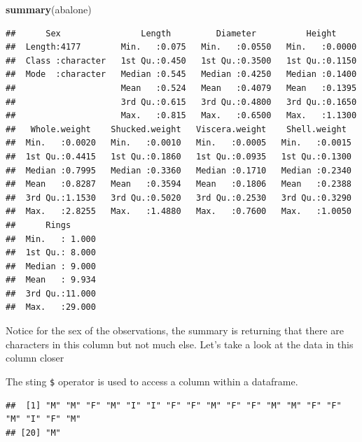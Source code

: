 \documentclass[
]{book}
\newenvironment{Shaded}{\begin{snugshade}}{\end{snugshade}}
\newcommand{\AttributeTok}[1]{\textcolor[rgb]{0.13,0.29,0.53}{#1}}
\newcommand{\CommentTok}[1]{\textcolor[rgb]{0.56,0.35,0.01}{\textit{#1}}}
\newcommand{\DecValTok}[1]{\textcolor[rgb]{0.00,0.00,0.81}{#1}}
\newcommand{\FunctionTok}[1]{\textcolor[rgb]{0.13,0.29,0.53}{\textbf{#1}}}
\newcommand{\NormalTok}[1]{#1}
\newcommand{\SpecialCharTok}[1]{\textcolor[rgb]{0.81,0.36,0.00}{\textbf{#1}}}
\begin{document}
\begin{Shaded}
\begin{Highlighting}[]
\FunctionTok{summary}\NormalTok{(abalone)}
\end{Highlighting}
\end{Shaded}

\begin{verbatim}
##      Sex                Length         Diameter          Height      
##  Length:4177        Min.   :0.075   Min.   :0.0550   Min.   :0.0000  
##  Class :character   1st Qu.:0.450   1st Qu.:0.3500   1st Qu.:0.1150  
##  Mode  :character   Median :0.545   Median :0.4250   Median :0.1400  
##                     Mean   :0.524   Mean   :0.4079   Mean   :0.1395  
##                     3rd Qu.:0.615   3rd Qu.:0.4800   3rd Qu.:0.1650  
##                     Max.   :0.815   Max.   :0.6500   Max.   :1.1300  
##   Whole.weight    Shucked.weight   Viscera.weight    Shell.weight   
##  Min.   :0.0020   Min.   :0.0010   Min.   :0.0005   Min.   :0.0015  
##  1st Qu.:0.4415   1st Qu.:0.1860   1st Qu.:0.0935   1st Qu.:0.1300  
##  Median :0.7995   Median :0.3360   Median :0.1710   Median :0.2340  
##  Mean   :0.8287   Mean   :0.3594   Mean   :0.1806   Mean   :0.2388  
##  3rd Qu.:1.1530   3rd Qu.:0.5020   3rd Qu.:0.2530   3rd Qu.:0.3290  
##  Max.   :2.8255   Max.   :1.4880   Max.   :0.7600   Max.   :1.0050  
##      Rings       
##  Min.   : 1.000  
##  1st Qu.: 8.000  
##  Median : 9.000  
##  Mean   : 9.934  
##  3rd Qu.:11.000  
##  Max.   :29.000
\end{verbatim}

Notice for the sex of the observations, the summary is returning that there are characters in this column but not much else. Let's take a look at the data in this column closer

The sting \texttt{\$} operator is used to access a column within a dataframe.

\begin{Shaded}
\end{Shaded}

\begin{verbatim}
##  [1] "M" "M" "F" "M" "I" "I" "F" "F" "M" "F" "F" "M" "M" "F" "F" "M" "I" "F" "M"
## [20] "M"
\end{verbatim}
\end{document}
